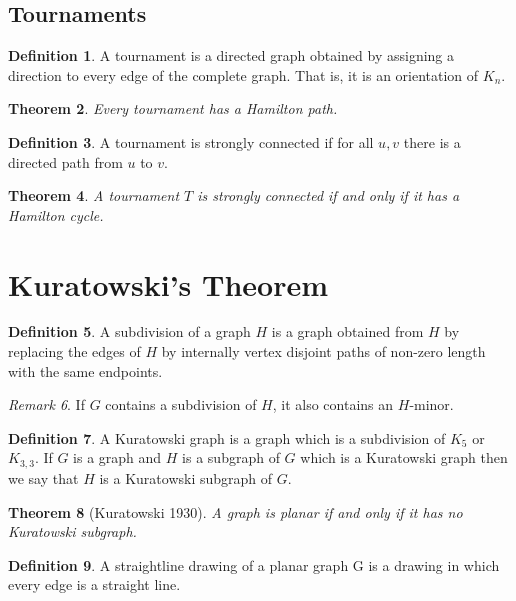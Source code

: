 \documentclass[10pt, fleqn, a4paper, landscape]{article}
\theoremstyle{plain} %
\newtheorem{thm}{Theorem}
\theoremstyle{remark} %
\newtheorem{rem}[thm]{Remark}
\theoremstyle{definition} %
\newtheorem{defi}[thm]{Definition}
\begin{document}
\begin{multicols}{3}
\begin{tiny}
\subsection{Tournaments}
\begin{defi}
A tournament is a directed graph obtained by assigning a direction to every
edge of the complete graph. That is, it is an orientation of $K_n$.
\end{defi}

\begin{thm}
Every tournament has a Hamilton path.
\end{thm}

\begin{defi}
A tournament is strongly connected if for all $u, v$ there is a directed path from $u$ to $v$.
\end{defi}
\begin{thm}
A tournament $T$ is strongly connected if and only if it has a Hamilton cycle.
\end{thm}

\section{Kuratowski’s Theorem}

\begin{defi}
A subdivision of a graph $H$ is a graph obtained from $H$ by replacing the edges of $H$ by internally vertex disjoint paths of non-zero length with the same endpoints.
\end{defi}
\addtocounter{thm}{1}
\begin{rem}
If $G$ contains a subdivision of $H$, it also contains an $H$-minor.
\end{rem}

\begin{defi}
A Kuratowski graph is a graph which is a subdivision of $K_5$ or $K_{3,3}$. If $G$ is a graph and $H$ is a subgraph of $G$ which is a Kuratowski graph then we say that $H$ is a Kuratowski subgraph of $G$.
\end{defi}

\begin{thm}[Kuratowski 1930]
A graph is planar if and only if it has no Kuratowski subgraph.
\end{thm}

\begin{defi}
A straightline drawing of a planar graph G is a drawing in which every edge is a straight line.
\end{defi}


\end{tiny}
\end{multicols}
\end{document}
